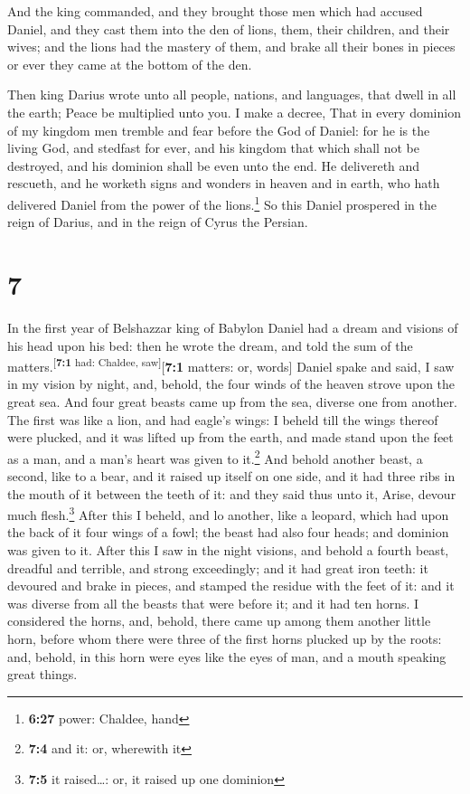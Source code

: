  And the king commanded, and they brought those men which
had accused Daniel, and they cast them into the den of lions, them,
their children, and their wives; and the lions had the mastery of them,
and brake all their bones in pieces or ever they came at the bottom of
the den.

 Then king Darius wrote unto all people, nations, and
languages, that dwell in all the earth; Peace be multiplied unto you.
 I make a decree, That in every dominion of my kingdom
men tremble and fear before the God of Daniel: for he is the living God,
and stedfast for ever, and his kingdom that which shall not be
destroyed, and his dominion shall be even unto the end. 
He delivereth and rescueth, and he worketh signs and wonders in heaven
and in earth, who hath delivered Daniel from the power of the
lions.\footnote{\textbf{6:27} power: Chaldee, hand}  So
this Daniel prospered in the reign of Darius, and in the reign of Cyrus
the Persian.

\hypertarget{section-6}{%
\section{7}\label{section-6}}

 In the first year of Belshazzar king of Babylon Daniel
had a dream and visions of his head upon his bed: then he wrote the
dream, and told the sum of the matters.\textsuperscript{{[}\textbf{7:1}
had: Chaldee, saw{]}}{[}\textbf{7:1} matters: or, words{]}
 Daniel spake and said, I saw in my vision by night, and,
behold, the four winds of the heaven strove upon the great sea.
 And four great beasts came up from the sea, diverse one
from another.  The first was like a lion, and had eagle's
wings: I beheld till the wings thereof were plucked, and it was lifted
up from the earth, and made stand upon the feet as a man, and a man's
heart was given to it.\footnote{\textbf{7:4} and it: or, wherewith it}
 And behold another beast, a second, like to a bear, and
it raised up itself on one side, and it had three ribs in the mouth of
it between the teeth of it: and they said thus unto it, Arise, devour
much flesh.\footnote{\textbf{7:5} it raised\ldots: or, it raised up one
  dominion}  After this I beheld, and lo another, like a
leopard, which had upon the back of it four wings of a fowl; the beast
had also four heads; and dominion was given to it.  After
this I saw in the night visions, and behold a fourth beast, dreadful and
terrible, and strong exceedingly; and it had great iron teeth: it
devoured and brake in pieces, and stamped the residue with the feet of
it: and it was diverse from all the beasts that were before it; and it
had ten horns.  I considered the horns, and, behold, there
came up among them another little horn, before whom there were three of
the first horns plucked up by the roots: and, behold, in this horn were
eyes like the eyes of man, and a mouth speaking great things.

